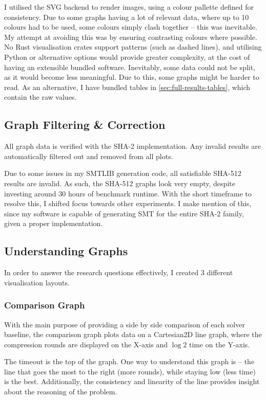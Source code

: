 \documentclass[a4paper]{report}
\begin{document}
I utilised the SVG backend to render images, using a colour pallette defined for consistency.
Due to some graphs having a lot of relevant data, where up to 10 colours had to be used, some colours simply clash together -- this was inevitable.
My attempt at avoiding this was by ensuring contrasting colours where possible.
No Rust visualisation crates support patterns (such as dashed lines), and utilising Python or alternative options would provide greater complexity,
at the cost of having an extensible bundled software.
Inevitably, some data could not be split, as it would become less meaningful.
Due to this, some graphs might be harder to read.
As an alternative, I have bundled tables in \ref{sec:full-results-tables}, which contain the raw values.

\subsection{Graph Filtering \& Correction}
\label{ssec:graph-filtering-and-correction}
All graph data is verified with the SHA-2 implementation.
Any invalid results are automatically filtered out and removed from all plots.

Due to some issues in my SMTLIB generation code, all satisfiable SHA-512 results are invalid.
As such, the SHA-512 graphs look very empty, despite investing around 30 hours of benchmark runtime.
With the short timeframe to resolve this, I shifted focus towards other experiments.
I make mention of this, since my software is capable of generating SMT for the entire SHA-2 family, given a proper implementation.

\subsection{Understanding Graphs}
In order to answer the research questions effectively, I created 3 different visualisation layouts.

\subsubsection{Comparison Graph}
With the main purpose of providing a side by side comparison of each solver baseline, the comparison graph plots data on a Cartesian2D line graph,
where the compression rounds are displayed on the X-axis and $\log 2$ time on the Y-axis.

The timeout is the top of the graph.
One way to understand this graph is -- the line that goes the most to the right (more rounds), while staying low (less time) is the best.
Additionally, the consistency and linearity of the line provides insight about the reasoning of the problem.
\end{document}
